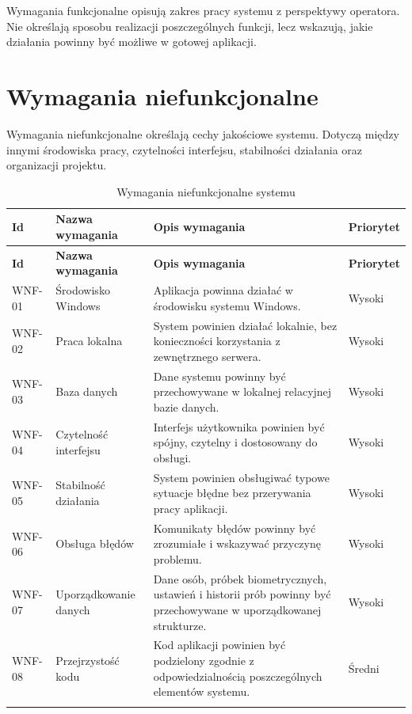 Wymagania funkcjonalne opisują zakres pracy systemu z perspektywy operatora. Nie określają sposobu realizacji poszczególnych funkcji, lecz wskazują, jakie działania powinny być możliwe w gotowej aplikacji.

\section{Wymagania niefunkcjonalne}

Wymagania niefunkcjonalne określają cechy jakościowe systemu. Dotyczą między innymi środowiska pracy, czytelności interfejsu, stabilności działania oraz organizacji projektu.

\renewcommand{\arraystretch}{1.15}
\begin{xltabular}{\textwidth}{|
    >{\RaggedRight\arraybackslash}p{1.5cm}|
    >{\RaggedRight\arraybackslash}p{3.2cm}|
    >{\RaggedRight\arraybackslash}X|
    >{\RaggedRight\arraybackslash}p{1.8cm}|}

    \hline
    \textbf{Id} & \textbf{Nazwa wymagania} & \textbf{Opis wymagania} & \textbf{Priorytet} \\
    \hline
    \endfirsthead

    \hline
    \textbf{Id} & \textbf{Nazwa wymagania} & \textbf{Opis wymagania} & \textbf{Priorytet} \\
    \hline
    \endhead

    WNF-01 & Środowisko Windows & Aplikacja powinna działać w środowisku systemu Windows. & Wysoki \\
    \hline
    WNF-02 & Praca lokalna & System powinien działać lokalnie, bez konieczności korzystania z zewnętrznego serwera. & Wysoki \\
    \hline
    WNF-03 & Baza danych & Dane systemu powinny być przechowywane w lokalnej relacyjnej bazie danych. & Wysoki \\
    \hline
    WNF-04 & Czytelność interfejsu & Interfejs użytkownika powinien być spójny, czytelny i dostosowany do obsługi. & Wysoki \\
    \hline
    WNF-05 & Stabilność działania & System powinien obsługiwać typowe sytuacje błędne bez przerywania pracy aplikacji. & Wysoki \\
    \hline
    WNF-06 & Obsługa błędów & Komunikaty błędów powinny być zrozumiałe i wskazywać przyczynę problemu. & Wysoki \\
    \hline
    WNF-07 & Uporządkowanie danych & Dane osób, próbek biometrycznych, ustawień i historii prób powinny być przechowywane w uporządkowanej strukturze. & Wysoki \\
    \hline
    WNF-08 & Przejrzystość kodu & Kod aplikacji powinien być podzielony zgodnie z odpowiedzialnością poszczególnych elementów systemu. & Średni \\
    \hline

    \caption{Wymagania niefunkcjonalne systemu}
    \label{tab:wymagania-niefunkcjonalne}
\end{xltabular}

